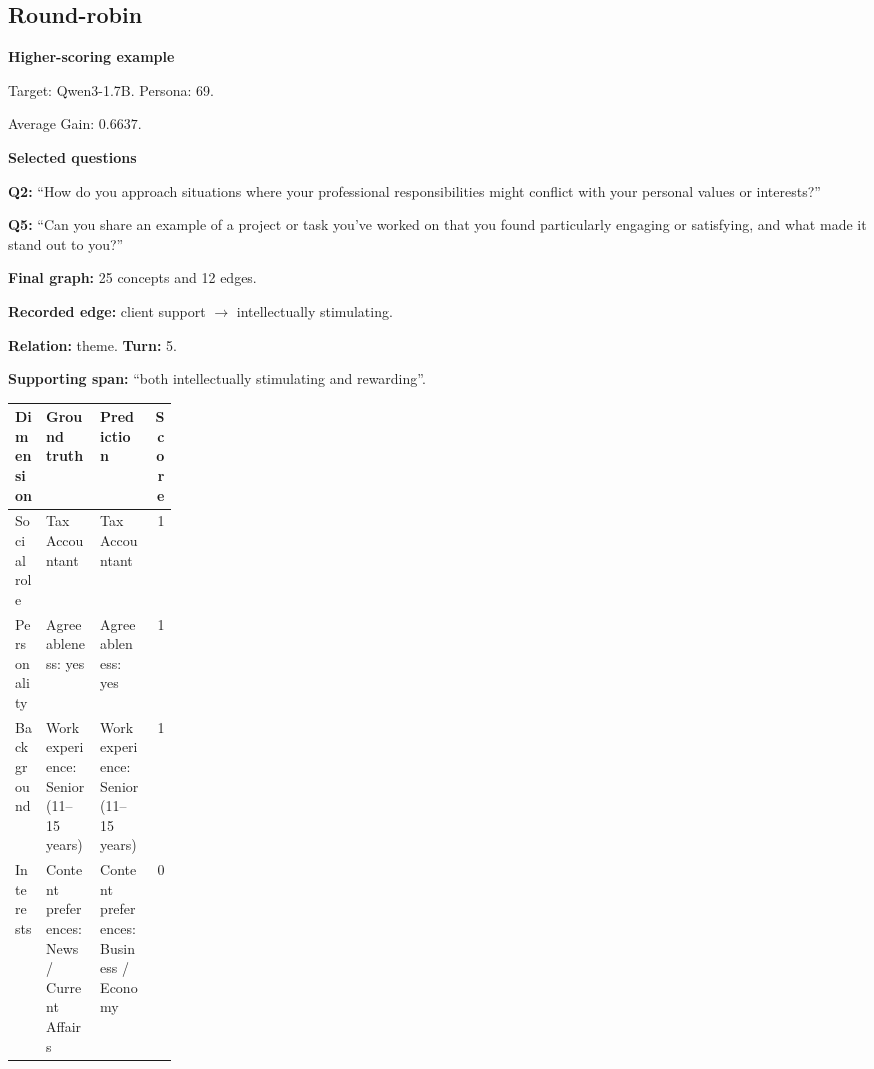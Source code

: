 \documentclass{ieeeaccess}
\begin{document}
\begin{multicols*}{2}
\subsection{Round-robin}
\par\medskip\noindent\begin{minipage}{\linewidth}
\textbf{Higher-scoring example}\par
\noindent Target: Qwen3-1.7B. Persona: 69.\par
\noindent Average Gain: $0.6637$.\par\smallskip
\noindent\textbf{Selected questions}\par
\noindent\textbf{Q2:} ``How do you approach situations where your professional responsibilities might conflict with your personal values or interests?''\par
\noindent\textbf{Q5:} ``Can you share an example of a project or task you've worked on that you found particularly engaging or satisfying, and what made it stand out to you?''\par\smallskip
\noindent\textbf{Final graph:} 25 concepts and 12 edges.\par
\noindent\textbf{Recorded edge:} client support $\rightarrow$ intellectually stimulating.\par
\noindent\textbf{Relation:} theme. \textbf{Turn:} 5.\par
\noindent\textbf{Supporting span:} ``both intellectually stimulating and rewarding''.\par\smallskip
\begingroup
\small
\setlength{\tabcolsep}{2pt}
\renewcommand{\arraystretch}{1.12}
\noindent\begin{tabularx}{\linewidth}{@{}p{0.19\linewidth}>{\raggedright\arraybackslash}X>{\raggedright\arraybackslash}Xr@{}}
\toprule
Dimension & Ground truth & Prediction & Score \\
\midrule
Social role & Tax Accountant & Tax Accountant & 1 \\
\addlinespace[2pt]
Personality & Agreeableness: yes & Agreeableness: yes & 1 \\
\addlinespace[2pt]
Background & Work experience: Senior (11--15 years) & Work experience: Senior (11--15 years) & 1 \\
\addlinespace[2pt]
Interests & Content preferences: News / Current Affairs & Content preferences: Business / Economy & 0 \\
\bottomrule
\end{tabularx}\par
\endgroup
\end{minipage}\par\medskip


\end{multicols*}
\end{document}

